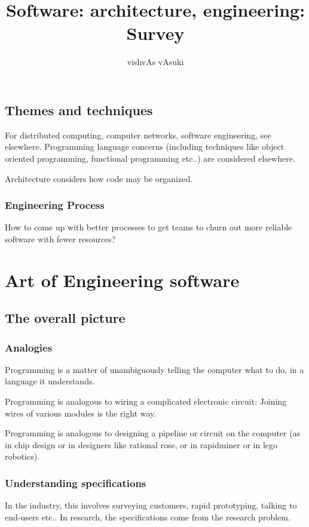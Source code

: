 \documentclass[oneside, article]{memoir}
\title{Software: architecture, engineering: Survey}
\author{vishvAs vAsuki}
\begin{document}
\maketitle

\tableofcontents

\chapter{Themes and techniques}
For distributed computing, computer networks, software engineering, see elsewhere. Programming language concerns (including techniques like object oriented programming, functional programming etc..) are considered elsewhere.

Architecture considers how code may be organized.

\section{Engineering Process}
How to come up with better processes to get teams to churn out more reliable software with fewer resources?

\part{Art of Engineering software}
\chapter{The overall picture}
\section{Analogies}
Programming is a matter of unambiguously telling the computer what to do, in a language it understands.

Programming is analogous to wiring a complicated electronic circuit: Joining wires of various modules is the right way.

Programming is analogous to designing a pipeline or circuit on the computer (as in chip design or in designers like rational rose, or in rapidminer or in lego robotics).

\section{Understanding specifications}
In the industry, this involves surveying customers, rapid prototyping, talking to end-users etc.. In research, the specifications come from the research problem.
\end{document}
